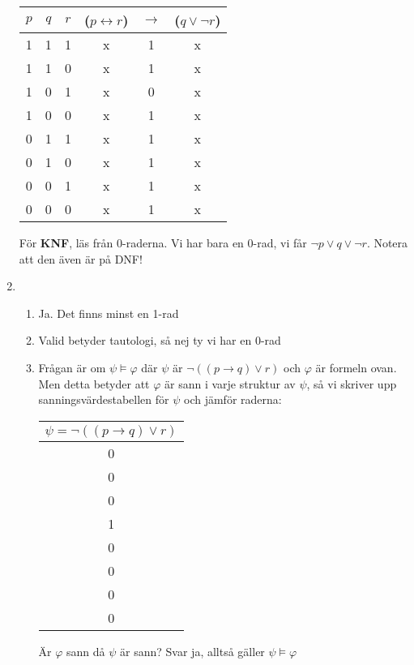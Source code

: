 \begin{enumerate}
    \begin{center}
      \begin{tabular}{|c|c|c|c|c|c|}
        \hline
        $p$&$q$&$r$&($p\leftrightarrow r$)&$\rightarrow$&($q\vee\neg r$)\\
        \hline
        1&1&1&x&1&x\\
        \hline
        1&1&0&x&1&x\\
        \hline
        1&0&1&x&0&x\\
        \hline
        1&0&0&x&1&x\\
        \hline
        0&1&1&x&1&x\\
        \hline
        0&1&0&x&1&x\\
        \hline
        0&0&1&x&1&x\\
        \hline
        0&0&0&x&1&x\\
        \hline
      \end{tabular}
    \end{center}
    \par\bigskip
    \noindent För \textbf{KNF}, läs från 0-raderna. Vi har bara en 0-rad, vi får $\neg p\vee q \vee \neg r$. Notera att den även är på DNF!
    \par\bigskip

  \item
    \begin{enumerate}

      \item Ja. Det finns minst en 1-rad
      \item Valid betyder tautologi, så nej ty vi har en 0-rad
      \item Frågan är om $\psi\vDash\varphi$ där $\psi$ är $\neg((p\rightarrow q)\vee r)$ och $\varphi$ är formeln ovan. Men detta betyder att $\varphi$ är sann i varje struktur av $\psi$, så vi skriver upp sanningsvärdestabellen för $\psi$ och jämför raderna:
        \begin{center}
          \begin{tabular}{|c|}
            \hline
            $\psi = \neg((p\rightarrow q)\vee r)$\\
            \hline
            0\\
            \hline
            0\\
            \hline
            0\\
            \hline
            1\\
            \hline
            0\\
            \hline
            0\\
            \hline
            0\\
            \hline
            0\\
            \hline
          \end{tabular}
        \end{center}
        \par\bigskip
        \noindent Är $\varphi$ sann då $\psi$ är sann? Svar ja, alltså gäller $\psi\vDash\varphi$
        \par\bigskip


\end{enumerate}
\end{enumerate}
